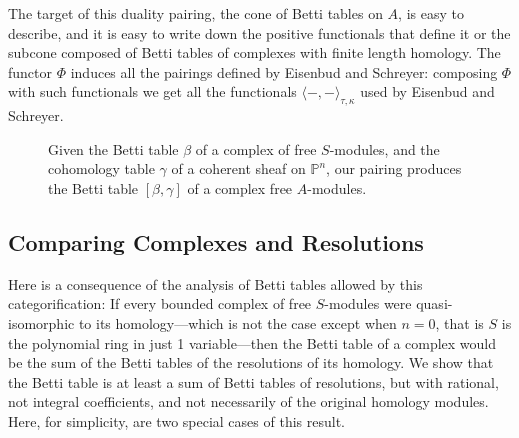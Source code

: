 \documentclass[12pt]{amsart}
\theoremstyle{definition}
\theoremstyle{remark}
\newcommand{\PP}{\mathbb{P}}
\newcommand{\CQ}{\mathrm{C}}
\newcommand{\BBQ}{\underline{\mathrm{B}}}
\begin{document}
The target of this duality pairing, the cone of Betti tables on $A$, is easy to describe, and it is easy to write down the positive functionals that define it or the subcone composed of Betti tables of complexes with finite length homology. 
The functor $\Phi$ induces all the pairings defined by Eisenbud and Schreyer: composing $\Phi$ with such functionals we get all the functionals $\langle -,-\rangle_{\tau,\kappa}$ used by Eisenbud and Schreyer.
\begin{figure}
\caption{Given the Betti table $\beta$ of a complex of free $S$-modules, and the cohomology table $\gamma$ of a coherent sheaf on $\PP^n$, our pairing produces the Betti table $[\beta, \gamma]$ of a complex free $A$-modules.
}
\label{fig:bracket}
\end{figure}

\subsection*{Comparing Complexes and Resolutions} Here is a consequence of the analysis of Betti tables allowed by this categorification: If every bounded complex of free $S$-modules were quasi-isomorphic to its homology---which is not the case except when $n=0$, that is $S$ is the polynomial ring in just 1 variable---then the Betti table of a complex would be the sum of the Betti tables of the resolutions of its homology.  We show that the Betti table is at least a sum of Betti tables of resolutions, but with rational, not integral coefficients, and not necessarily of the original homology modules. Here, for simplicity, are two special cases of this result.
\end{document}
